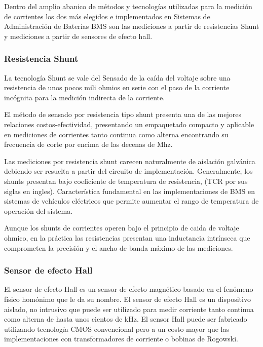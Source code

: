 \documentclass[10pt,a4paper]{article}
\begin{document}
	Dentro del amplio abanico de métodos y tecnologías utilizadas para la medición de corrientes los dos más elegidos e implementados en Sistemas de Administración de Baterías \acrshort{BMS} son las mediciones a partir de resistencias Shunt y mediciones a partir de sensores de efecto hall.
	
	\subsubsection{Resistencia Shunt}

	La tecnología Shunt se vale del Sensado de la caída del voltaje sobre una resistencia de unos pocos mili ohmios en serie con el paso de la corriente incógnita para la medición indirecta de la corriente.
	
	El método de sensado por resistencia tipo shunt presenta una de las mejores relaciones costos-efectividad, presentando un empaquetado compacto y aplicable en mediciones de corrientes tanto continua como alterna encontrando su frecuencia de corte por encima de las decenas de Mhz.
	
	Las mediciones por resistencia shunt carecen naturalmente de aislación galvánica debiendo ser resuelta a partir del circuito de implementación. Generalmente, los shunts presentan bajo coeficiente de temperatura de resistencia, (\acrfull{TCR} por sus siglas en ingles). Característica fundamental en las implementaciones de \acrshort{BMS} en sistemas de vehículos eléctricos que permite aumentar el rango de temperatura de operación del sistema.
	
	Aunque los shunts de corrientes operen bajo el principio de caida de voltaje ohmico, en la práctica las resistencias presentan una inductancia intrínseca que comprometen la precisión y el ancho de banda máximo de las mediciones.
	
	\subsubsection{Sensor de efecto Hall}

	El sensor de efecto Hall es un sensor de efecto magnético basado en el fenómeno físico homónimo que le da su nombre. 
	El sensor de efecto Hall es un dispositivo aislado, no intrusivo que puede ser utilizado para medir corriente tanto continua como alterna de hasta unos cientos de kHz. El sensor Hall puede ser fabricado utilizando tecnología CMOS convencional pero a un costo mayor que las implementaciones con transformadores de corriente o bobinas de Rogowski.
	
\end{document}
